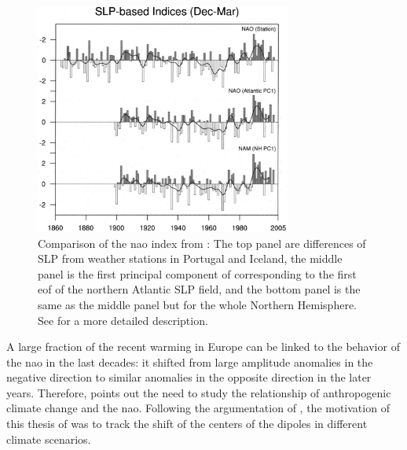 \begin{figure}[htb]
  \begin{center}
    \includegraphics[width=0.75\textwidth]{figures/hurrel_nao_index_comparison.png}
  \end{center}
  \caption[NAO Index Comparison by Hurrel]{Comparison of the \ac{nao} index from \cite{hurrell_overview_2003}: The top panel are differences of SLP from weather stations in Portugal and Iceland, the middle panel is the first principal component of corresponding to the first \ac{eof} of the northern Atlantic SLP field, and the bottom panel is the same as the middle panel but for the whole Northern Hemisphere. See \cite{hurrell_overview_2003} for a more detailed description.}
  \label{fig:naoindex_comparison}
\end{figure}

A large fraction of the recent warming in Europe can be linked to the behavior of the \ac{nao} in the last decades: it shifted from large amplitude anomalies in the negative direction to similar anomalies in the opposite direction in the later years. 
Therefore, \cite{hurrell_overview_2003} points out the need to study the relationship of anthropogenic climate change and the \ac{nao}. 
Following the argumentation of \cite{hurrell_overview_2003}, the motivation of this thesis of  was to track the shift of the centers of the dipoles in different climate scenarios.   


